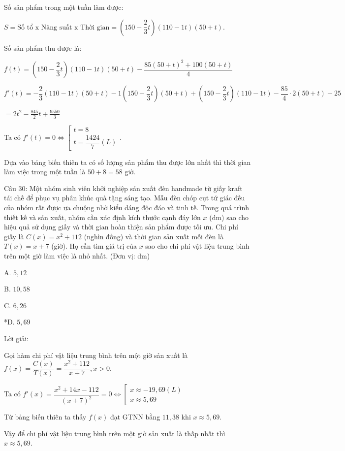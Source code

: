 \documentclass[a4paper,12pt]{article}
\begin{document}
Số sản phẩm trong một tuần làm được:

\(S = \text{Số tổ x Năng suất x Thời gian} = \left(150 - \dfrac{2}{3} t\right)\left(110 - 1 t\right)(50 + t)\).

Số sản phẩm thu được là:

\(f(t) = \left(150 - \dfrac{2}{3} t\right)\left(110 - 1 t\right)(50 + t) - \dfrac{85(50 + t)^2 + 100(50 + t)}{4}\)

\(f'(t) = -\dfrac{2}{3}\left(110 - 1 t\right)(50 + t) - 1\left(150 - \dfrac{2}{3} t\right)(50 + t) + \left(150 - \dfrac{2}{3} t\right)\left(110 - 1 t\right) - \dfrac{85}{4} \cdot 2(50 + t) - 25\)

\(= 2t^{2} - \frac{845}{2}t + \frac{9550}{3}\)

Ta có \(f'(t) = 0 \Leftrightarrow \left[\begin{array}{l}t = 8 \\ t = \dfrac{1424}{7}(L)\end{array}\right.\).

Dựa vào bảng biến thiên ta có số lượng sản phẩm thu được lớn nhất thì thời gian làm việc trong một tuần là \(50 + 8 = 58\) giờ.




Câu 30: Một nhóm sinh viên khởi nghiệp sản xuất đèn handmade từ giấy kraft tái chế để phục vụ phân khúc quà tặng sáng tạo. Mẫu đèn chóp cụt tứ giác đều của nhóm rất được ưa chuộng nhờ kiểu dáng độc đáo và tinh tế. Trong quá trình thiết kế và sản xuất, nhóm cần xác định kích thước cạnh đáy lớn \(x\) (dm) sao cho hiệu quả sử dụng giấy và thời gian hoàn thiện sản phẩm được tối ưu. Chi phí giấy là \(C(x) = x^2 + 112\) (nghìn đồng) và thời gian sản xuất mỗi đèn là \(T(x) = x + 7\) (giờ). Họ cần tìm giá trị của \(x\) sao cho chi phí vật liệu trung bình trên một giờ làm việc là nhỏ nhất. (Đơn vị: dm)

A. \(5,12\)

B. \(10,58\)

C. \(6,26\)

*D. \(5,69\)

Lời giải:


Gọi hàm chi phí vật liệu trung bình trên một giờ sản xuất là \(f(x)=\dfrac{C(x)}{T(x)}=\dfrac{x^2+112}{x+7}, x>0\).

Ta có \(f'(x)=\dfrac{x^2+14x-112}{(x+7)^2}=0 \Leftrightarrow \left[\begin{array}{l}x \approx -19,69(L) \\ x \approx 5,69\end{array}\right.\)

Từ bảng biến thiên ta thấy \(f(x)\) đạt GTNN bằng \(11,38\) khi \(x \approx 5,69\).

Vậy để chi phí vật liệu trung bình trên một giờ sản xuất là thấp nhất thì \(x \approx 5,69\).
\end{document}
